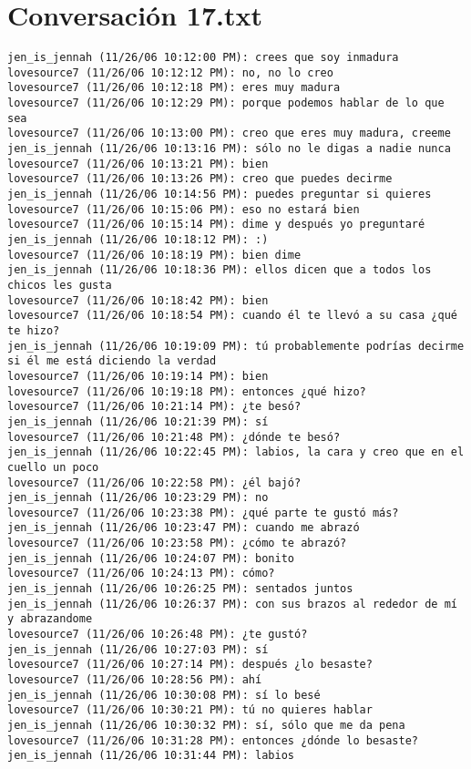 \section{Conversaci\'on 17.txt}

\begin{verbatim}
jen_is_jennah (11/26/06 10:12:00 PM): crees que soy inmadura
lovesource7 (11/26/06 10:12:12 PM): no, no lo creo
lovesource7 (11/26/06 10:12:18 PM): eres muy madura
lovesource7 (11/26/06 10:12:29 PM): porque podemos hablar de lo que sea
lovesource7 (11/26/06 10:13:00 PM): creo que eres muy madura, creeme
jen_is_jennah (11/26/06 10:13:16 PM): sólo no le digas a nadie nunca
lovesource7 (11/26/06 10:13:21 PM): bien
lovesource7 (11/26/06 10:13:26 PM): creo que puedes decirme
jen_is_jennah (11/26/06 10:14:56 PM): puedes preguntar si quieres
lovesource7 (11/26/06 10:15:06 PM): eso no estará bien
lovesource7 (11/26/06 10:15:14 PM): dime y después yo preguntaré
jen_is_jennah (11/26/06 10:18:12 PM): :)
lovesource7 (11/26/06 10:18:19 PM): bien dime
jen_is_jennah (11/26/06 10:18:36 PM): ellos dicen que a todos los chicos les gusta
lovesource7 (11/26/06 10:18:42 PM): bien
lovesource7 (11/26/06 10:18:54 PM): cuando él te llevó a su casa ¿qué te hizo?
jen_is_jennah (11/26/06 10:19:09 PM): tú probablemente podrías decirme si él me está diciendo la verdad
lovesource7 (11/26/06 10:19:14 PM): bien
lovesource7 (11/26/06 10:19:18 PM): entonces ¿qué hizo?
lovesource7 (11/26/06 10:21:14 PM): ¿te besó?
jen_is_jennah (11/26/06 10:21:39 PM): sí
lovesource7 (11/26/06 10:21:48 PM): ¿dónde te besó?
jen_is_jennah (11/26/06 10:22:45 PM): labios, la cara y creo que en el cuello un poco
lovesource7 (11/26/06 10:22:58 PM): ¿él bajó?
jen_is_jennah (11/26/06 10:23:29 PM): no
lovesource7 (11/26/06 10:23:38 PM): ¿qué parte te gustó más?
jen_is_jennah (11/26/06 10:23:47 PM): cuando me abrazó
lovesource7 (11/26/06 10:23:58 PM): ¿cómo te abrazó?
jen_is_jennah (11/26/06 10:24:07 PM): bonito
lovesource7 (11/26/06 10:24:13 PM): cómo?
jen_is_jennah (11/26/06 10:26:25 PM): sentados juntos
jen_is_jennah (11/26/06 10:26:37 PM): con sus brazos al rededor de mí y abrazandome
lovesource7 (11/26/06 10:26:48 PM): ¿te gustó?
jen_is_jennah (11/26/06 10:27:03 PM): sí
lovesource7 (11/26/06 10:27:14 PM): después ¿lo besaste?
lovesource7 (11/26/06 10:28:56 PM): ahí
jen_is_jennah (11/26/06 10:30:08 PM): sí lo besé
lovesource7 (11/26/06 10:30:21 PM): tú no quieres hablar
jen_is_jennah (11/26/06 10:30:32 PM): sí, sólo que me da pena
lovesource7 (11/26/06 10:31:28 PM): entonces ¿dónde lo besaste?
jen_is_jennah (11/26/06 10:31:44 PM): labios

\end{verbatim}
